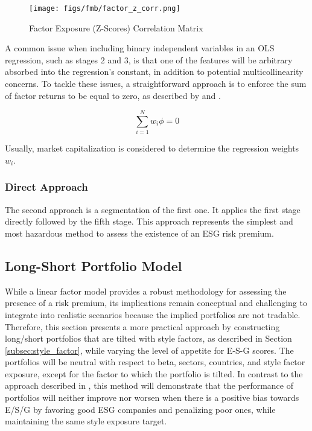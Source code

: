 \documentclass[11pt,a4paper]{article}
\begin{document}
\begin{figure}[h!] 
    \centering
    \texttt{[image: figs/fmb/factor\_z\_corr.png]} 
    \caption{Factor Exposure (Z-Scores) Correlation Matrix}
    \label{fig:fmb_factor_z_corr}
\end{figure}

A common issue when including binary independent variables in an OLS regression, such as stages 2 and 3, is that one of the features will be arbitrary absorbed into the regression's constant, in addition to potential multicollinearity concerns.
To tackle these issues, a straightforward approach is to enforce the sum of factor returns to be equal to zero, as described by  and .

\begin{equation}
    \sum_{i=1}^{N}{w_{i}\phi = 0}
\end{equation}

Usually, market capitalization is considered to determine the regression weights $w_{i}$.

\subsubsection{Direct Approach}

The second approach is a segmentation of the first one. It applies the first stage directly followed by the fifth stage. 
This approach represents the simplest and most hazardous method to assess the existence of an ESG risk premium.

\subsection{Long-Short Portfolio Model}\label{sec:methodo_lsptf}

While a linear factor model provides a robust methodology for assessing the presence of a risk premium, its implications remain conceptual and challenging to integrate into realistic scenarios because the implied portfolios are not tradable. 
Therefore, this section presents a more practical approach by constructing long/short portfolios that are tilted with style factors, as described in Section \ref{subsec:style_factor}, while varying the level of appetite for E-S-G scores. 
The portfolios will be neutral with respect to beta, sectors, countries, and style factor exposure, except for the factor to which the portfolio is tilted. 
In contrast to the approach described in , this method will demonstrate that the performance of portfolios will neither improve nor worsen when there is a positive bias towards E/S/G by favoring good ESG companies and penalizing poor ones, while maintaining the same style exposure target.
\end{document}
